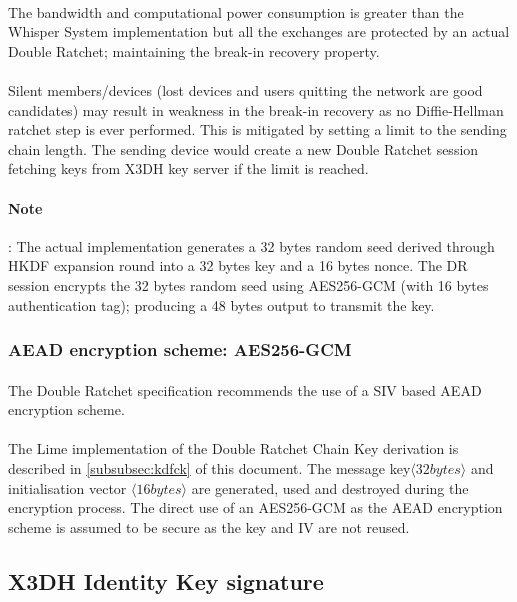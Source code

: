 \documentclass[a4paper,11pt]{article}
\begin{document}
    \paragraph{}The bandwidth and computational power consumption is greater than the Whisper System implementation but all the exchanges are protected by an actual Double Ratchet; maintaining the break-in recovery property.
    \paragraph{}Silent members/devices (lost devices and users quitting the network are good candidates) may result in weakness in the break-in recovery as no Diffie-Hellman ratchet step is ever performed. This is mitigated by setting a limit to the sending chain length. The sending device would create a new Double Ratchet session fetching keys from X3DH key server if the limit is reached.
    \paragraph{Note}: The actual implementation generates a 32 bytes random seed derived through HKDF\cite{rfc5869} expansion round into a 32 bytes key and a 16 bytes nonce. The DR session encrypts the 32 bytes random seed using AES256-GCM (with 16 bytes authentication tag); producing a 48 bytes output to transmit the key.
  
  \subsubsection{AEAD encryption scheme: AES256-GCM}
  \paragraph{}The Double Ratchet specification \cite[section 5.2]{doubleRatchet} recommends the use of a SIV based AEAD encryption scheme.
  \paragraph{}The Lime implementation of the Double Ratchet Chain Key derivation is described in \ref{subsubsec:kdfck} of this document. The message key$\langle 32 bytes\rangle$ and initialisation vector $\langle 16 bytes\rangle $ are generated, used and destroyed during the encryption process. The direct use of an AES256-GCM as the AEAD encryption scheme is assumed to be secure as the key and IV are not reused.

  \subsection{X3DH Identity Key signature}
    \label{subsec:x3dhIk}
\end{document}
